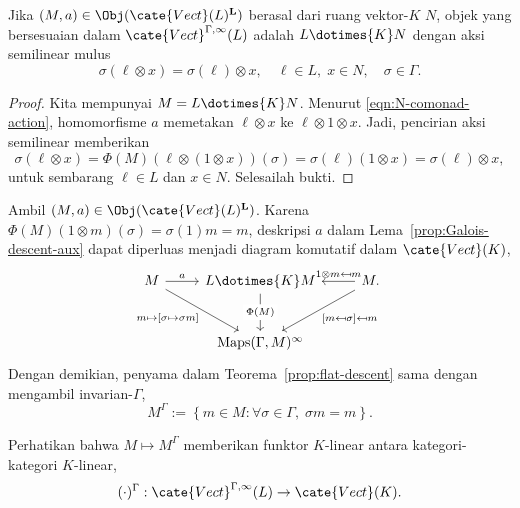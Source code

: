 \begin{lemma}\label{prop:Galois-descent-action}
	Jika $(M,a)\in\Obj(\cate{Vect}(L)^{\mathbf{L}})$ berasal dari ruang
	vektor-$K$ $N$, objek yang bersesuaian dalam
	$\cate{Vect}^{\Gamma,\infty}(L)$ adalah $L\dotimes{K}N$ dengan aksi
	semilinear mulus
	\[ \sigma (\ell \otimes x) = \sigma(\ell) \otimes x, \quad \ell \in L, \; x \in N, \quad \sigma \in \Gamma. \]
\end{lemma}
\begin{proof}
	Kita mempunyai $M=L\dotimes{K}N$. Menurut
	\eqref{eqn:N-comonad-action}, homomorfisme $a$ memetakan
	$\ell\otimes x$ ke $\ell\otimes1\otimes x$. Jadi, pencirian aksi
	semilinear memberikan
	\[ \sigma (\ell \otimes x) = \Phi(M)(\ell \otimes (1 \otimes x))(\sigma) = \sigma(\ell) (1 \otimes x) = \sigma(\ell) \otimes x, \]
	untuk sembarang $\ell\in L$ dan $x\in N$. Selesailah bukti.
\end{proof}

Ambil $(M,a)\in\Obj(\cate{Vect}(L)^{\mathbf{L}})$. Karena
$\Phi(M)(1\otimes m)(\sigma)=\sigma(1)m=m$, deskripsi $a$ dalam
Lema~\ref{prop:Galois-descent-aux} dapat diperluas menjadi diagram komutatif
dalam $\cate{Vect}(K)$,
\[\begin{tikzcd}[row sep=large]
	M \arrow[r, "a"] \arrow[rd, "{m \mapsto [\sigma \mapsto \sigma m]}"'] & L \dotimes{K} M \arrow[d, "\Phi(M)" description] & M. \arrow[l, "{1 \otimes m \mapsfrom m}"'] \arrow[ld, "{[m \mapsfrom \sigma] \mapsfrom m}"] \\
	& \mathrm{Maps}(\Gamma, M)^\infty &
\end{tikzcd}\]
Dengan demikian, penyama dalam Teorema~\ref{prop:flat-descent} sama dengan
mengambil invarian-$\Gamma$,
\[ M^\Gamma := \left\{ m \in M: \forall \sigma \in \Gamma, \; \sigma m = m \right\}. \]

Perhatikan bahwa $M\mapsto M^\Gamma$ memberikan funktor $K$-linear antara
kategori-kategori $K$-linear,
\[ (\cdot)^{\Gamma}: \cate{Vect}^{\Gamma, \infty}(L) \to \cate{Vect}(K). \]

